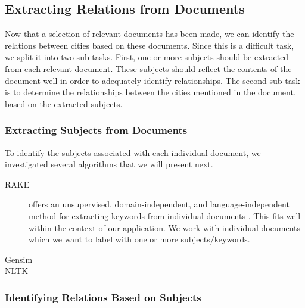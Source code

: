\subsection{Extracting Relations from Documents}
Now that a selection of relevant documents has been made, we can identify the relations between cities based on these documents. Since this is a difficult task, we split it into two sub-tasks. 
First, one or more subjects should be extracted from each relevant document. These subjects should reflect the contents of the document well in order to adequately identify relationships.
The second sub-task is to determine the relationships between the cities mentioned in the document, based on the extracted subjects.



\subsubsection{Extracting Subjects from Documents}
To identify the subjects associated with each individual document, we investigated several algorithms that we will present next.

\begin{description}
    \item[RAKE] offers an unsupervised, domain-independent, and language-independent method for extracting keywords from individual documents \cite{rose2010automatic}. This fits well within the context of our application. We work with individual documents which we want to label with one or more subjects/keywords.
    \item[Gensim]
    \item[NLTK]
\end{description}


\subsubsection{Identifying Relations Based on Subjects}








